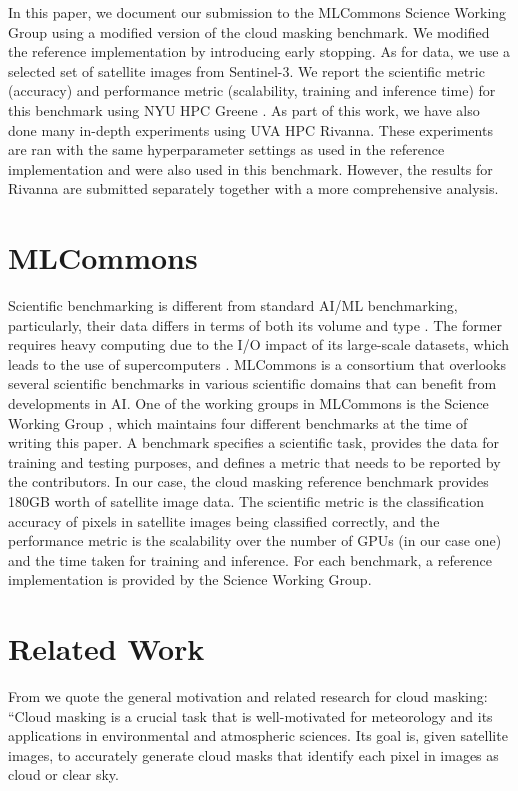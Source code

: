 \documentclass[sigplan,screen]{acmart}
\begin{document}
In this paper, we document our submission to the MLCommons Science Working Group using a modified version of the cloud masking benchmark. We modified the reference implementation by introducing early stopping. As for data, we use a selected set of satellite images from Sentinel-3. We report the scientific metric (accuracy) and performance metric 
(scalability, training and inference time)
for this benchmark using NYU HPC Greene \cite{www-greene}. As part of this work, we have also done many in-depth experiments using UVA HPC Rivanna. These experiments are ran with the same hyperparameter settings as used in the reference implementation and were also used in this benchmark. However, the results for Rivanna are submitted separately together with a more  comprehensive analysis.

\section{MLCommons}

Scientific benchmarking is different from standard AI/ML benchmarking, particularly, their data differs in terms of both its volume and type \cite{las-2023-mlcommons-edu-eq}. The former requires heavy computing due to the I/O impact of its large-scale datasets, which leads to the use of supercomputers \cite{Farrell2021MLPerfHA}. MLCommons is a consortium that overlooks several scientific benchmarks in various scientific domains that can benefit from developments in AI. One of the working groups in MLCommons is the Science Working Group \cite{Thiyagalingam2022AIBF}, which maintains four different benchmarks at the time of writing this paper. A benchmark specifies a scientific task, provides the data for training and testing purposes, and defines a metric that needs to be reported by the contributors. In our case, the cloud masking reference benchmark provides 180GB worth of satellite image data. The scientific metric is the classification accuracy of pixels in satellite images being classified correctly, and the performance metric is the scalability over the number of GPUs (in our case one) and the time taken for training and inference. 
For each benchmark, a reference implementation is provided by the Science Working Group.

\section{Related Work}

From \cite{las-2023-cloudmask-related} we quote the general motivation and related research for cloud masking: ``Cloud masking is a crucial task that is well-motivated for meteorology and its applications in environmental and atmospheric sciences. Its goal is, given satellite images, to accurately generate cloud masks that identify each pixel in images as cloud or clear sky.
\end{document}
